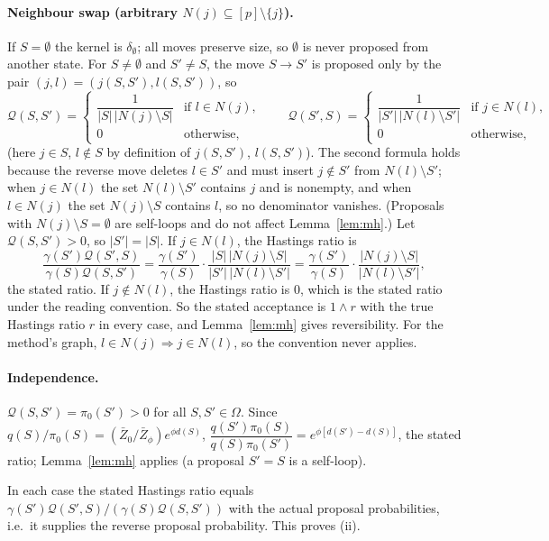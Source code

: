 \documentclass[11pt]{article}
\theoremstyle{remark}
\newcommand{\Om}{\Omega}
\newcommand{\Zb}{\bar Z}
\begin{document}
\paragraph{Neighbour swap (arbitrary $N(j)\subseteq[p]\setminus\{j\}$).} If $S=\emptyset$ the kernel is $\delta_\emptyset$; all moves preserve size, so $\emptyset$ is never proposed from another state. For $S\ne\emptyset$ and $S'\ne S$, the move $S\to S'$ is proposed only by the pair $(j,l)=(j(S,S'),l(S,S'))$, so
\[\mathcal Q(S,S')=\begin{cases}\dfrac{1}{|S|\,|N(j)\setminus S|}&\text{if } l\in N(j),\\[1ex] 0&\text{otherwise,}\end{cases}\qquad
\mathcal Q(S',S)=\begin{cases}\dfrac{1}{|S'|\,|N(l)\setminus S'|}&\text{if } j\in N(l),\\[1ex] 0&\text{otherwise,}\end{cases}\]
(here $j\in S$, $l\notin S$ by definition of $j(S,S')$, $l(S,S')$). The second formula holds because the reverse move deletes $l\in S'$ and must insert $j\notin S'$ from $N(l)\setminus S'$; when $j\in N(l)$ the set $N(l)\setminus S'$ contains $j$ and is nonempty, and when $l\in N(j)$ the set $N(j)\setminus S$ contains $l$, so no denominator vanishes. (Proposals with $N(j)\setminus S=\emptyset$ are self-loops and do not affect Lemma~\ref{lem:mh}.) Let $\mathcal Q(S,S')>0$, so $|S'|=|S|$. If $j\in N(l)$, the Hastings ratio is
\[\frac{\gamma(S')\mathcal Q(S',S)}{\gamma(S)\mathcal Q(S,S')}=\frac{\gamma(S')}{\gamma(S)}\cdot\frac{|S|\,|N(j)\setminus S|}{|S'|\,|N(l)\setminus S'|}=\frac{\gamma(S')}{\gamma(S)}\cdot\frac{|N(j)\setminus S|}{|N(l)\setminus S'|},\]
the stated ratio. If $j\notin N(l)$, the Hastings ratio is $0$, which is the stated ratio under the reading convention. So the stated acceptance is $1\wedge r$ with the true Hastings ratio $r$ in every case, and Lemma~\ref{lem:mh} gives reversibility. For the method's graph, $l\in N(j)\Rightarrow j\in N(l)$, so the convention never applies.

\paragraph{Independence.} $\mathcal Q(S,S')=\pi_0(S')>0$ for all $S,S'\in\Om$. Since $q(S)/\pi_0(S)=(\Zb_0/\Zb_\phi)e^{\phi d(S)}$,
$\dfrac{q(S')\pi_0(S)}{q(S)\pi_0(S')}=e^{\phi[d(S')-d(S)]}$, the stated ratio; Lemma~\ref{lem:mh} applies (a proposal $S'=S$ is a self-loop).

In each case the stated Hastings ratio equals $\gamma(S')\mathcal Q(S',S)/(\gamma(S)\mathcal Q(S,S'))$ with the actual proposal probabilities, i.e.\ it supplies the reverse proposal probability. This proves (ii).
\end{document}
